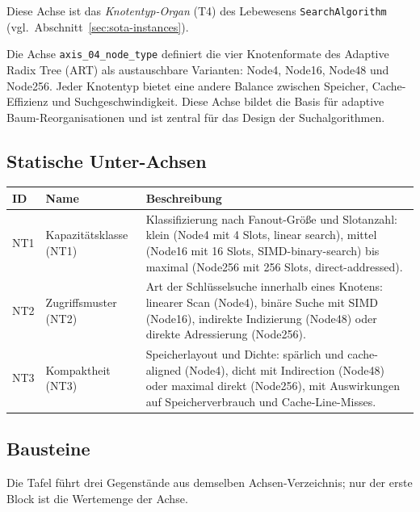 Diese Achse ist das \emph{Knotentyp-Organ} (T4) des Lebewesens \texttt{SearchAlgorithm} (vgl.\ Abschnitt~\ref{sec:sota-instances}).

Die Achse \texttt{axis\_\allowbreak{}04\_\allowbreak{}node\_\allowbreak{}type} definiert die vier Knotenformate des Adaptive Radix Tree (ART) als austauschbare Varianten: Node4, Node16, Node48 und Node256. Jeder Knotentyp bietet eine andere Balance zwischen Speicher, Cache-Effizienz und Suchgeschwindigkeit. Diese Achse bildet die Basis für adaptive Baum-Reorganisationen und ist zentral für das Design der Suchalgorithmen.

\subsection*{Statische Unter-Achsen}

\begin{scriptsize}
\begin{longtable}{@{}>{\raggedright\arraybackslash}p{1.8cm} >{\raggedright\arraybackslash}p{3.2cm} >{\raggedright\arraybackslash}p{8.5cm}@{}}
\toprule
ID & Name & Beschreibung \\
\midrule
\endhead%
NT1 & Kapazitätsklasse (NT1) & Klassifizierung nach Fanout-Größe und Slotanzahl: klein (Node4 mit 4 Slots, linear search), mittel (Node16 mit 16 Slots, SIMD-binary-search) bis maximal (Node256 mit 256 Slots, direct-addressed). \\
NT2 & Zugriffsmuster (NT2) & Art der Schlüsselsuche innerhalb eines Knotens: linearer Scan (Node4), binäre Suche mit SIMD (Node16), indirekte Indizierung (Node48) oder direkte Adressierung (Node256). \\
NT3 & Kompaktheit (NT3) & Speicherlayout und Dichte: spärlich und cache-aligned (Node4), dicht mit Indirection (Node48) oder maximal direkt (Node256), mit Auswirkungen auf Speicherverbrauch und Cache-Line-Misses. \\
\bottomrule
\end{longtable}
\end{scriptsize}

\subsection*{Bausteine}

Die Tafel führt drei Gegenstände aus demselben Achsen-Verzeichnis; nur der erste Block ist die Wertemenge der Achse.

